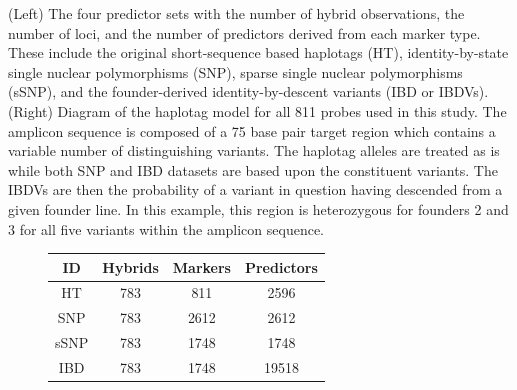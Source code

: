 \begin{tcolorbox}[enhanced jigsaw, opacitybacktitle=0.6, bottomtitle=1mm, colback=white, arc=.35mm, opacityback=0, breakable=false, left=2mm, titlerule=0mm, rightrule=.15mm, toprule=.15mm, colbacktitle=quarto-callout-color!10!white, bottomrule=.15mm, coltitle=black, toptitle=1mm, title={Table 1 Description of four probesets used in hybrid prediction}, leftrule=.75mm]

(Left) The four predictor sets with the number of hybrid observations,
the number of loci, and the
number of predictors derived from each marker type. These include the
original short-sequence based haplotags (HT), identity-by-state single nuclear polymorphisms (SNP), sparse single nuclear polymorphisms (sSNP), and the
founder-derived identity-by-descent variants (IBD or IBDVs). (Right) Diagram of the haplotag model for all 811 probes
used in this study. The amplicon sequence is composed of a 75 base pair
        target region which contains a variable number of distinguishing variants. The haplotag alleles are treated as is while both SNP and IBD datasets are based upon the constituent variants. The IBDVs are then the probability of a variant in question having descended from a given founder line. In this example, this region is heterozygous for founders 2 and 3 for all five variants within the amplicon sequence.

\label{table:1}

\begin{figure}[H]

\begin{minipage}[t]{0.50\linewidth}

{\centering 

\begin{longtable}[]{@{}cccc@{}}
\toprule\noalign{}
ID & Hybrids & Markers & Predictors \\
\midrule\noalign{}
\endhead
\bottomrule\noalign{}
\endlastfoot
HT & 783 & 811 & 2596 \\
SNP & 783 & 2612 & 2612 \\
sSNP & 783 & 1748 & 1748 \\
IBD & 783 & 1748 & 19518 \\
\end{longtable}

}

\end{minipage}%
%
\begin{minipage}[t]{0.50\linewidth}

{\centering 

}
\end{minipage}
\end{figure}
\end{tcolorbox}

